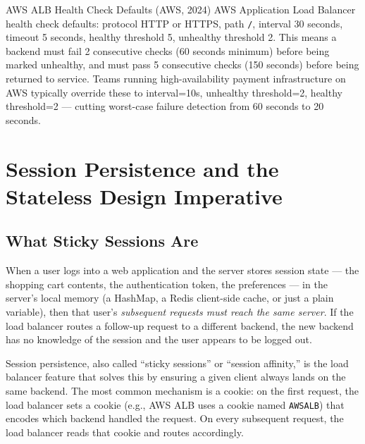\documentclass[11pt,a4paper]{article}
\begin{document}
\begin{industrybox}{AWS ALB Health Check Defaults (AWS, 2024)}
  AWS Application Load Balancer health check defaults: protocol HTTP or HTTPS, path \texttt{/},
  interval 30 seconds, timeout 5 seconds, healthy threshold 5, unhealthy threshold 2. This means
  a backend must fail 2 consecutive checks (60 seconds minimum) before being marked unhealthy, and
  must pass 5 consecutive checks (150 seconds) before being returned to service. Teams running
  high-availability payment infrastructure on AWS typically override these to interval=10s,
  unhealthy threshold=2, healthy threshold=2 --- cutting worst-case failure detection from 60
  seconds to 20 seconds.
\end{industrybox}

\section{Session Persistence and the Stateless Design Imperative}

\subsection{What Sticky Sessions Are}

When a user logs into a web application and the server stores session state --- the shopping cart
contents, the authentication token, the preferences --- in the server's local memory (a HashMap, a
Redis client-side cache, or just a plain variable), then that user's \emph{subsequent requests must
reach the same server}. If the load balancer routes a follow-up request to a different backend, the
new backend has no knowledge of the session and the user appears to be logged out.

Session persistence, also called ``sticky sessions'' or ``session affinity,'' is the load balancer
feature that solves this by ensuring a given client always lands on the same backend. The most
common mechanism is a cookie: on the first request, the load balancer sets a cookie (e.g., AWS ALB
uses a cookie named \texttt{AWSALB}) that encodes which backend handled the request. On every
subsequent request, the load balancer reads that cookie and routes accordingly.
\end{document}
